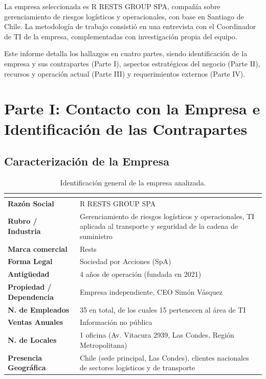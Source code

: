 \documentclass[12pt]{article}
\begin{document}
La empresa seleccionada es R RESTS GROUP SPA, compa\~n\'ia sobre gerenciamiento de riesgos log\'isticos y operacionales, con base en Santiago de Chile.
La metodolog\'ia de trabajo consisti\'o en una entrevista con el Coordinador de TI de la empresa, complementadas con investigaci\'on propia del equipo.

Este informe detalla los hallazgos en cuatro partes, siendo identificaci\'on de la empresa
y sus contrapartes (Parte I), aspectos estrat\'egicos del negocio (Parte II), recursos y
operaci\'on actual (Parte III) y requerimientos externos (Parte IV).

\newpage

\section{Parte I: Contacto con la Empresa e Identificaci\'on de las Contrapartes}

\subsection{Caracterizaci\'on de la Empresa}

\begin{table}[H]
\centering
\renewcommand{\arraystretch}{1.4}
\begin{tabularx}{\textwidth}{>{\bfseries}l X}
\toprule
\rowcolor{headerblue}\multicolumn{2}{c}{\textcolor{white}{\textbf{Ficha de Identificaci\'on de la Empresa}}} \\
\midrule
Raz\'on Social          & R RESTS GROUP SPA \\
\rowcolor{rowgray}
Rubro / Industria       & Gerenciamiento de riesgos log\'isticos y operacionales, TI aplicada al transporte y seguridad de la cadena de suministro \\
Marca comercial         & Rests \\
\rowcolor{rowgray}
Forma Legal             & Sociedad por Acciones (SpA) \\
Antig\"uedad            & 4 a\~nos de operaci\'on (fundada en 2021) \\
\rowcolor{rowgray}
Propiedad / Dependencia & Empresa independiente, CEO Sim\'on V\'asquez \\
N.\textordmasculine{} de Empleados      & 35 en total, de los cuales 15 pertenecen al \'area de TI \\
\rowcolor{rowgray}
Ventas Anuales          & Informaci\'on no p\'ublica \\
N.\textordmasculine{} de Locales        & 1 oficina (Av. Vitacura 2939, Las Condes, Regi\'on Metropolitana) \\
\rowcolor{rowgray}
Presencia Geogr\'afica  & Chile (sede principal, Las Condes), clientes nacionales de sectores log\'isticos y de transporte \\
\bottomrule
\end{tabularx}
\caption{Identificaci\'on general de la empresa analizada.}
\end{table}
\end{document}
